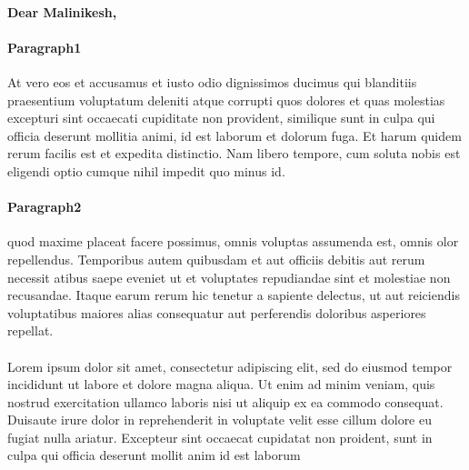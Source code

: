 \documentclass[a4paper]{article}%
\begin{document}
%
\normalsize%
\paragraph{}%
\label{para:}%
\begin{Large}%
\textbf{Dear Malinikesh,}%
\end{Large}

%
\paragraph{Paragraph1}%
\label{para:Paragraph1}%
At vero eos et accusamus et iusto odio dignissimos ducimus qui blanditiis praesentium voluptatum deleniti atque corrupti quos dolores et quas molestias excepturi sint occaecati cupiditate non provident, similique sunt in culpa qui officia deserunt mollitia animi, id est laborum et dolorum fuga. Et harum quidem rerum facilis est et expedita distinctio. Nam libero tempore, cum soluta nobis est eligendi optio cumque nihil impedit quo minus id.

%
\paragraph{Paragraph2}%
\label{para:Paragraph2}%
quod maxime placeat facere possimus, omnis voluptas assumenda est, omnis olor repellendus. Temporibus autem quibusdam et aut officiis debitis aut rerum necessit atibus saepe eveniet ut et voluptates repudiandae sint et molestiae non recusandae. Itaque earum rerum hic tenetur a sapiente delectus, ut aut reiciendis voluptatibus maiores alias consequatur aut perferendis doloribus asperiores repellat.

%
\paragraph{}%
\label{para:}%
Lorem ipsum dolor sit amet, consectetur adipiscing elit, sed do eiusmod tempor incididunt ut labore et dolore magna aliqua. Ut enim ad minim veniam, quis nostrud exercitation ullamco laboris nisi ut aliquip ex ea commodo consequat. Duisaute irure dolor in reprehenderit in voluptate velit esse cillum dolore eu fugiat nulla ariatur. Excepteur sint occaecat cupidatat non proident, sunt in culpa qui officia deserunt mollit anim id est laborum

%
\end{document}
